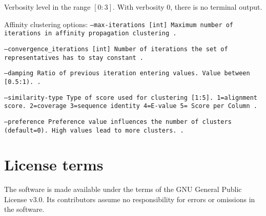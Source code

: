 \documentclass[11pt,a4paper]{report}
\begin{document}
Verbosity level in the range $[0:3]$. With verbosity $0$, there
is no terminal output.

Affinity clustering options:
\texttt{\small --max-iterations         [int]  Maximum number of iterations in affinity propagation clustering .}{\small \par}
\texttt{\small --convergence\_iterations [int]   Number of iterations the set of representatives has to stay constant .}{\small \par}
\texttt{\small --damping Ratio of previous iteration entering values. Value between [0.5:1). .}{\small \par}
\texttt{\small --similarity-type Type of score used for clustering [1:5]. 1=alignment score. 2=coverage 3=sequence identity 4=E-value 5= Score per Column .}{\small \par}
\texttt{\small --preference Preference value influences the number of clusters (default=0). High values lead to more clusters. .}{\small \par}







\section{License terms}

The software is made available under the terms of the GNU General
Public License v3.0. Its contributors assume no responsibility for
errors or omissions in the software.
\end{document}
